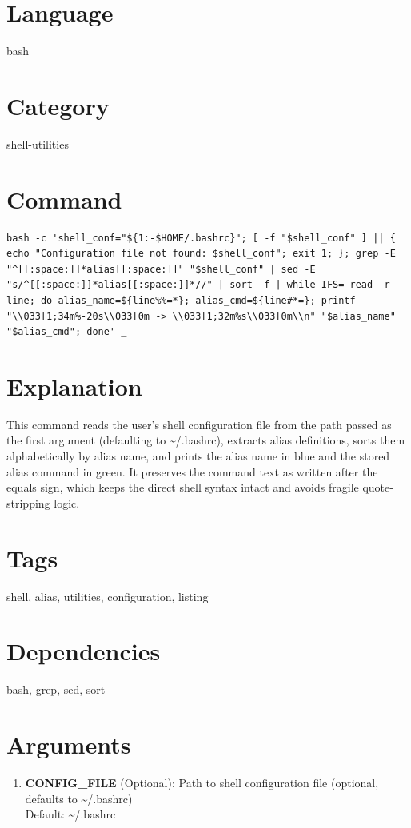 \documentclass[openany]{book}
\begin{document}
\section*{Language}
bash

\section*{Category}
shell-utilities

\section*{Command}
\begin{lstlisting}
bash -c 'shell_conf="${1:-$HOME/.bashrc}"; [ -f "$shell_conf" ] || { echo "Configuration file not found: $shell_conf"; exit 1; }; grep -E "^[[:space:]]*alias[[:space:]]" "$shell_conf" | sed -E "s/^[[:space:]]*alias[[:space:]]*//" | sort -f | while IFS= read -r line; do alias_name=${line%%=*}; alias_cmd=${line#*=}; printf "\\033[1;34m%-20s\\033[0m -> \\033[1;32m%s\\033[0m\\n" "$alias_name" "$alias_cmd"; done' _
\end{lstlisting}

\section*{Explanation}
This command reads the user's shell configuration file from the path passed as the first argument (defaulting to \textasciitilde{}/.bashrc), extracts alias definitions, sorts them alphabetically by alias name, and prints the alias name in blue and the stored alias command in green. It preserves the command text as written after the equals sign, which keeps the direct shell syntax intact and avoids fragile quote-stripping logic.

\section*{Tags}
shell, alias, utilities, configuration, listing

\section*{Dependencies}
bash, grep, sed, sort


\section*{Arguments}
\begin{enumerate}
  \item \textbf{CONFIG\_FILE} (Optional): Path to shell configuration file (optional, defaults to \textasciitilde{}/.bashrc) \\ Default: \textasciitilde{}/.bashrc
\end{enumerate}
\end{document}
